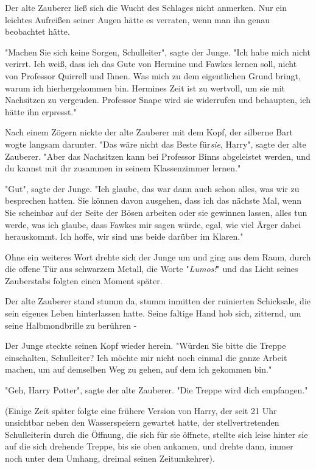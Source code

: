 {Der alte Zauberer ließ sich die Wucht des Schlages nicht anmerken. Nur ein leichtes Aufreißen seiner Augen hätte es verraten, wenn man ihn genau beobachtet hätte.

"Machen Sie sich keine Sorgen, Schulleiter", sagte der Junge. "Ich habe mich nicht verirrt. Ich weiß, dass ich das Gute von Hermine und Fawkes lernen soll, nicht von Professor Quirrell und Ihnen. Was mich zu dem eigentlichen Grund bringt, warum ich hierhergekommen bin. Hermines Zeit ist zu wertvoll, um sie mit Nachsitzen zu vergeuden. Professor Snape wird sie widerrufen und behaupten, ich hätte ihn erpresst."

Nach einem Zögern nickte der alte Zauberer mit dem Kopf, der silberne Bart wogte langsam darunter. "Das wäre nicht das Beste für\emph{sie}, Harry", sagte der alte Zauberer. "Aber das Nachsitzen kann bei Professor Binns abgeleistet werden, und du kannst mit ihr zusammen in seinem Klassenzimmer lernen."

"Gut", sagte der Junge. "Ich glaube, das war dann auch schon alles, was wir zu besprechen hatten. Sie können davon ausgehen, dass ich das nächste Mal, wenn Sie scheinbar auf der Seite der Bösen arbeiten oder sie gewinnen lassen, alles tun werde, was ich glaube, dass Fawkes mir sagen würde, egal, wie viel Ärger dabei herauskommt. Ich hoffe, wir sind uns beide darüber im Klaren."

Ohne ein weiteres Wort drehte sich der Junge um und ging aus dem Raum, durch die offene Tür aus schwarzem Metall, die Worte "\emph{Lumos!}" und das Licht seines Zauberstabs folgten einen Moment später.

Der alte Zauberer stand stumm da, stumm inmitten der ruinierten Schicksale, die sein eigenes Leben hinterlassen hatte. Seine faltige Hand hob sich, zitternd, um seine Halbmondbrille zu berühren -

Der Junge steckte seinen Kopf wieder herein. "Würden Sie bitte die Treppe einschalten, Schulleiter? Ich möchte mir nicht noch einmal die ganze Arbeit machen, um auf demselben Weg zu gehen, auf dem ich gekommen bin."

"Geh, Harry Potter", sagte der alte Zauberer. "Die Treppe wird dich empfangen."

(Einige Zeit später folgte eine frühere Version von Harry, der seit 21 Uhr unsichtbar neben den Wasserspeiern gewartet hatte, der stellvertretenden Schulleiterin durch die Öffnung, die sich für sie öffnete, stellte sich leise hinter sie auf die sich drehende Treppe, bis sie oben ankamen, und drehte dann, immer noch unter dem Umhang, dreimal seinen Zeitumkehrer).

}

